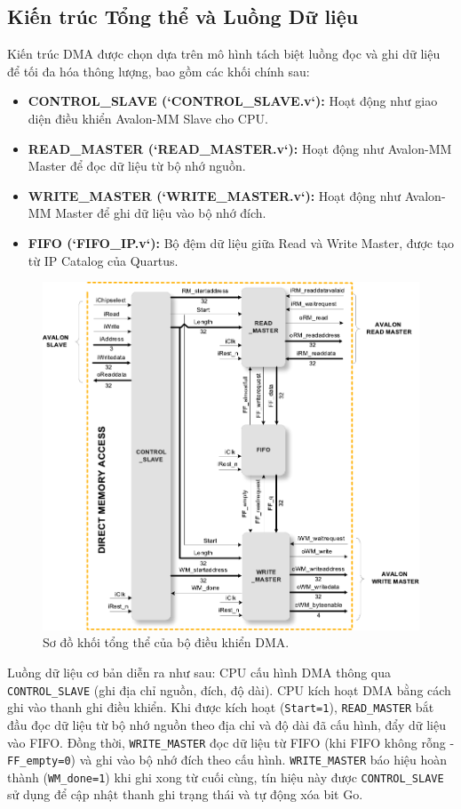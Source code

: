 \subsection{Kiến trúc Tổng thể và Luồng Dữ liệu}
Kiến trúc DMA được chọn dựa trên mô hình tách biệt luồng đọc và ghi dữ liệu để tối đa hóa thông lượng, bao gồm các khối chính sau:
\begin{itemize}
    \item \textbf{CONTROL\_SLAVE (`CONTROL\_SLAVE.v`):} Hoạt động như giao diện điều khiển Avalon-MM Slave cho CPU.
    \item \textbf{READ\_MASTER (`READ\_MASTER.v`):} Hoạt động như Avalon-MM Master để đọc dữ liệu từ bộ nhớ nguồn.
    \item \textbf{WRITE\_MASTER (`WRITE\_MASTER.v`):} Hoạt động như Avalon-MM Master để ghi dữ liệu vào bộ nhớ đích.
    \item \textbf{FIFO (`FIFO\_IP.v`):} Bộ đệm dữ liệu giữa Read và Write Master, được tạo từ IP Catalog của Quartus.
\end{itemize}

\begin{figure}[htbp]
    \centering
    \includegraphics[width=\linewidth]{Images/02_09_DMABlockDiagram}
    \caption{Sơ đồ khối tổng thể của bộ điều khiển DMA.}
    \label{fig:02_09_DMA_BlockDiagram}
\end{figure}

Luồng dữ liệu cơ bản diễn ra như sau: CPU cấu hình DMA thông qua \texttt{CONTROL\_SLAVE} (ghi địa chỉ nguồn, đích, độ dài). CPU kích hoạt DMA bằng cách ghi vào thanh ghi điều khiển. Khi được kích hoạt (\texttt{Start=1}), \texttt{READ\_MASTER} bắt đầu đọc dữ liệu từ bộ nhớ nguồn theo địa chỉ và độ dài đã cấu hình, đẩy dữ liệu vào FIFO. Đồng thời, \texttt{WRITE\_MASTER} đọc dữ liệu từ FIFO (khi FIFO không rỗng - \texttt{FF\_empty=0}) và ghi vào bộ nhớ đích theo cấu hình. \texttt{WRITE\_MASTER} báo hiệu hoàn thành (\texttt{WM\_done=1}) khi ghi xong từ cuối cùng, tín hiệu này được \texttt{CONTROL\_SLAVE} sử dụng để cập nhật thanh ghi trạng thái và tự động xóa bit Go.


